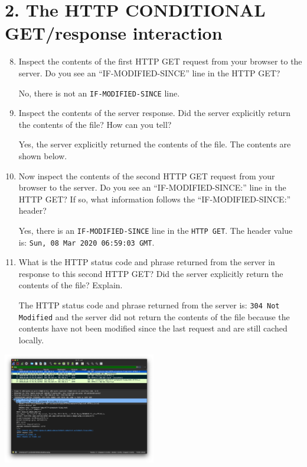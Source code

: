 \documentclass{article}
\begin{document}
\section*{2. The HTTP CONDITIONAL GET/response interaction}
\begin{enumerate}
\setcounter{enumi}{7}
\item Inspect the contents of the first HTTP GET request from your browser to the server. Do you see an “IF-MODIFIED-SINCE” line in the HTTP GET?

\textsf{No, there is not an \texttt{IF-MODIFIED-SINCE} line.}

\item Inspect the contents of the server response. Did the server explicitly return the contents of the file? How can you tell?

\textsf{Yes, the server explicitly returned the contents of the file. The contents are shown below.}

\item Now inspect the contents of the second HTTP GET request from your browser to the server. Do you see an “IF-MODIFIED-SINCE:” line in the HTTP GET? If so, what information follows the “IF-MODIFIED-SINCE:” header?

\textsf{Yes, there is an \texttt{IF-MODIFIED-SINCE} line in the \texttt{HTTP GET}. The header value is: \texttt{Sun, 08 Mar 2020 06:59:03 GMT}.}

\item What is the HTTP status code and phrase returned from the server in response to this second HTTP GET? Did the server explicitly return the contents of the file? Explain.

\textsf{The HTTP status code and phrase returned from the server is: \texttt{304 Not Modified} and the server did not return the contents of the file because the contents have not been modified since the last request and are still cached locally.}

\end{enumerate}
\includegraphics[width=0.5\textwidth]{lab2_part2_get1}
\end{document}
